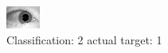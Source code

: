 \begin{figure}[h!]
\begin{center}
\includegraphics[width=0.60\columnwidth]{figures/ID1455_class_2_target_1.png}
\end{center}
\caption{ Classification: 2 actual target: 1}
\label{fig:ID1455_class_2_target_1}
\end{figure}
